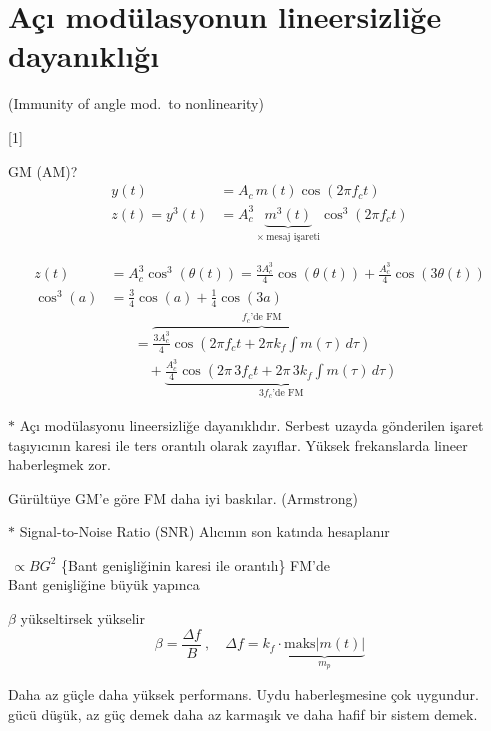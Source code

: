 \documentclass[11pt,a4paper]{article}
\begin{document}

\section{Açı modülasyonun lineersizliğe dayanıklığı}
(Immunity of angle mod.\ to nonlinearity)

[1]

GM (AM)?
\begin{align*}
y(t) &= A_c\, m(t)\cos(2\pi f_c t) \\
z(t) = y^3(t) &= A_c^3\,\underbrace{m^3(t)}_{\times\ \text{mesaj işareti}}\cos^3(2\pi f_c t)
\end{align*}

\begin{align*}
z(t) &= A_c^3\cos^3(\theta(t)) = \frac{3A_c^3}{4}\cos(\theta(t)) + \frac{A_c^3}{4}\cos(3\theta(t)) \\
\cos^3(a) &= \frac{3}{4}\cos(a) + \frac{1}{4}\cos(3a)
\end{align*}
\begin{align*}
&= \overbrace{\frac{3A_c^3}{4}\cos\left(2\pi f_c t + 2\pi k_f\int m(\tau)\,d\tau\right)}^{f_c\text{'de FM}} \\
&\quad + \underbrace{\frac{A_c^3}{4}\cos\left(2\pi\,3f_c t + 2\pi\,3k_f\int m(\tau)\,d\tau\right)}_{3f_c\text{'de FM}}
\end{align*}

$\ast$ Açı modülasyonu lineersizliğe dayanıklıdır. Serbest uzayda gönderilen işaret taşıyıcının karesi ile ters orantılı olarak zayıflar. Yüksek frekanslarda lineer haberleşmek zor.

Gürültüye GM'e göre FM daha iyi baskılar. (Armstrong)

$\ast$ Signal-to-Noise Ratio (SNR) \hfill Alıcının son katında hesaplanır

\noindent \okunamadi{$\sigma$}$\,\propto BG^2$ \quad \{Bant genişliğinin karesi ile orantılı\} FM'de \\
Bant genişliğine büyük yapınca

\noindent $\beta$ yükseltirsek \quad yükselir
\[ \beta=\frac{\Delta f}{B}\ ,\quad \Delta f = k_f\cdot\underbrace{\mathrm{maks}|m(t)|}_{m_p} \]

Daha az güçle daha yüksek performans.
Uydu haberleşmesine çok uygundur.  gücü düşük, az güç demek daha az karmaşık ve daha hafif bir sistem demek.
\end{document}
